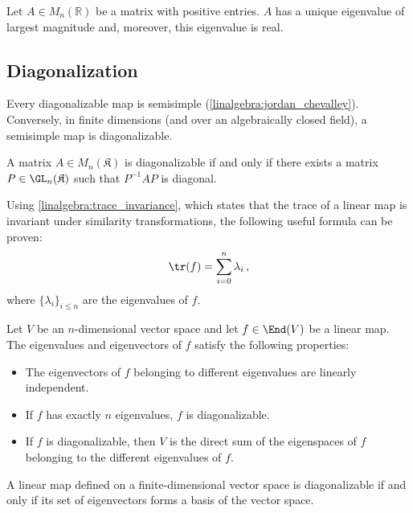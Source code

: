     \begin{theorem}\label{linalgebra:perron_frobenius}
        Let $A\in M_n(\mathbb{R})$ be a matrix with positive entries. $A$ has a unique eigenvalue of largest magnitude and, moreover, this eigenvalue is real.
    \end{theorem}

\subsection{Diagonalization}

    \begin{property}
        Every diagonalizable map is semisimple (\cref{linalgebra:jordan_chevalley}). Conversely, in finite dimensions (and over an algebraically closed field), a semisimple map is diagonalizable.
    \end{property}

    \begin{theorem}\label{linalgebra:diagonalizable_PQP}
        A matrix $A\in M_n(\mathfrak{K})$ is diagonalizable if and only if there exists a matrix $P\in\GL_n(\mathfrak{K})$ such that $P^{-1}AP$ is diagonal.
    \end{theorem}
    \begin{result}[Trace]
        Using \cref{linalgebra:trace_invariance}, which states that the trace of a linear map is invariant under similarity transformations, the following useful formula can be proven:
        \begin{gather}
            \tr(f) = \sum_{i=0}^n\lambda_i\,,
        \end{gather}
        where $\{\lambda_i\}_{i\leq n}$ are the eigenvalues of $f$.
    \end{result}

    \begin{property}\label{linalgebra:diagonalization_properties}
        Let $V$ be an $n$-dimensional vector space and let $f\in\End(V)$ be a linear map. The eigenvalues and eigenvectors of $f$ satisfy the following properties:
        \begin{itemize}
            \item The eigenvectors of $f$ belonging to different eigenvalues are linearly independent.
            \item If $f$ has exactly $n$ eigenvalues, $f$ is diagonalizable.
            \item If $f$ is diagonalizable, then $V$ is the direct sum of the eigenspaces of $f$ belonging to the different eigenvalues of $f$.
        \end{itemize}
    \end{property}
    \begin{theorem}\label{linalgebra:diagonalizable_basis}
        A linear map defined on a finite-dimensional vector space is diagonalizable if and only if its set of eigenvectors forms a basis of the vector space.
    \end{theorem}

